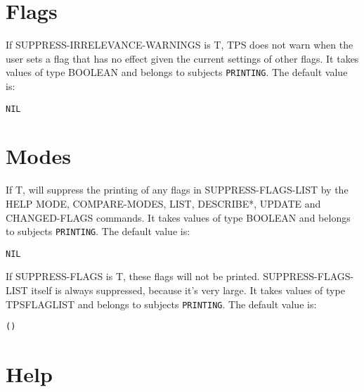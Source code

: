 \section{Flags}

\begin{description} 
\item[SUPPRESS-IRRELEVANCE-WARNINGS]  
If SUPPRESS-IRRELEVANCE-WARNINGS is T, TPS does not warn when the user
sets a flag that has no effect given the current settings of other flags.
It takes values of type BOOLEAN and belongs to subjects \texttt{PRINTING}.  The default value is: \begin{lstlisting}
NIL
\end{lstlisting}

\item
\end{description}

\section{Modes}

\begin{description} 
\item[SUPPRESS-FLAGS]  
If T, will suppress the printing of any flags in SUPPRESS-FLAGS-LIST
by the HELP MODE, COMPARE-MODES, LIST, DESCRIBE*, UPDATE and CHANGED-FLAGS
commands.
It takes values of type BOOLEAN and belongs to subjects \texttt{PRINTING}.  The default value is: \begin{lstlisting}
NIL
\end{lstlisting}

\item[SUPPRESS-FLAGS-LIST]  
If SUPPRESS-FLAGS is T, these flags will not be printed.
SUPPRESS-FLAGS-LIST itself is always suppressed, because it's very large.
It takes values of type TPSFLAGLIST and belongs to subjects \texttt{PRINTING}.  The default value is: \begin{lstlisting}
()
\end{lstlisting}

\item
\end{description}

\section{Help}

